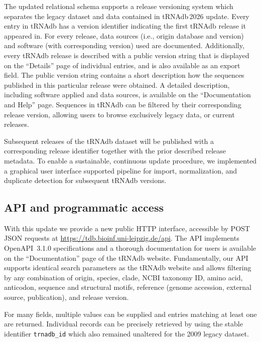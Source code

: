 \documentclass[unnumsec,webpdf,contemporary,large]{oup-authoring-template}
\newcommand{\TODO}[1]{\begingroup\color{red}#1\endgroup}
\begin{document}
The updated relational schema supports a release versioning system which
separates the legacy dataset and data contained in tRNAdb\,2026
update. Every entry in tRNAdb has a version identifier indicating the first
tRNAdb release it appeared in. For every release, data sources (i.e.,
origin database and version) and software (with corresponding version) used
are documented. Additionally, every tRNAdb release is described with a
public version string that is displayed on the ``Details'' page of
individual entries, and is also available as an export field. The public
version string contains a short description how the sequences published in
this particular release were obtained. A detailed description, including
software applied and data sources, is available on the ``Documentation and
Help'' page.  Sequences in tRNAdb can be filtered by their corresponding
release version, allowing users to browse exclusively legacy data, or
current releases.

Subsequent releases of the tRNAdb dataset will be published with a
corresponding release identifier together with the prior described release
metadata. To enable a sustainable, \TODO{continuous} update procedure, we implemented a graphical user interface supported pipeline for import, normalization, and duplicate detection for subsequent tRNAdb versions.

\subsection{API and programmatic access}

With this update we provide a new public HTTP interface, accessible by POST
JSON requests at \url{https://tdb.bioinf.uni-leipzig.de/api}. The API
implements OpenAPI~3.1.0 specifications and a thorough documentation for
users is available on the ``Documentation'' page of the tRNAdb
website. Fundamentally, our API supports identical search parameters as the
tRNAdb website and allows filtering by any combination of origin, species,
clade, NCBI taxonomy ID, amino acid, anticodon, sequence and structural
motifs, reference (genome accession, external source, publication), and
release version.

For many fields, multiple values can be supplied and entries matching at
least one are returned. Individual records can be precisely retrieved by
using the stable identifier \texttt{trnadb\_id} which also remained
unaltered for the 2009 legacy dataset.
\end{document}
